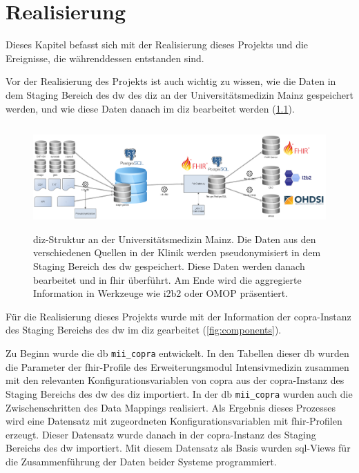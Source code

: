 \chapter{Realisierung} \label{ch:results}

Dieses Kapitel befasst sich mit der Realisierung dieses Projekts und die Ereignisse, die währenddessen entstanden sind.


Vor der Realisierung des Projekts ist auch wichtig zu wissen, wie die Daten in dem Staging Bereich des \ac{dw} des \ac{diz} an der Universitätsmedizin Mainz gespeichert werden, und wie diese Daten danach im \ac{diz} bearbeitet werden (\ref{fig:dizummz}).

\begin{figure}[ht]
	\centering
	\includegraphics[height=4cm]{figures/diz_ummz}
	\caption[\acs{diz}-Struktur an der Universitätsmedizin Mainz] {\acs{diz}-Struktur an der Universitätsmedizin Mainz. Die Daten aus den verschiedenen Quellen in der Klinik werden pseudonymisiert in dem Staging Bereich des \ac{dw} gespeichert. Diese Daten werden danach bearbeitet und in \ac{fhir} überführt. Am Ende wird die aggregierte Information in Werkzeuge wie i2b2 oder OMOP präsentiert.}
	\label{fig:dizummz}
\end{figure}

Für die Realisierung dieses Projekts wurde mit der Information der \ac{copra}-Instanz des Staging Bereichs des \ac{dw} im \ac{diz} gearbeitet (\ref{fig:components}).

 Zu Beginn wurde die \ac{db} \texttt{mii\_copra} entwickelt. In den Tabellen dieser \ac{db} wurden die Parameter der \ac{fhir}-Profile des Erweiterungsmodul \glqq Intensivmedizin\grqq{} zusammen mit den relevanten Konfigurationsvariablen von \ac{copra} aus der \ac{copra}-Instanz des Staging Bereichs des \ac{dw} des \ac{diz} importiert. In der \ac{db} \texttt{mii\_copra} wurden auch die Zwischenschritten des Data Mappings realisiert. Als Ergebnis dieses Prozesses wird eine Datensatz mit zugeordneten Konfigurationsvariablen mit \ac{fhir}-Profilen erzeugt. Dieser Datensatz wurde danach in der \ac{copra}-Instanz des Staging Bereichs des \ac{dw} importiert. Mit diesem Datensatz als Basis wurden \ac{sql}-Views für die Zusammenführung der Daten beider Systeme programmiert.

